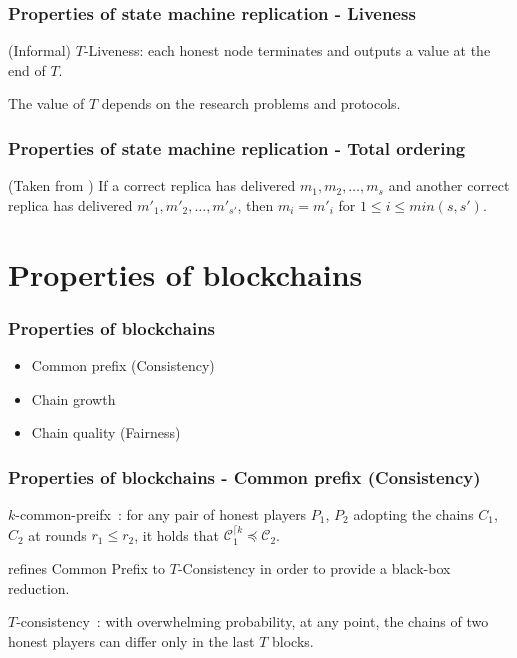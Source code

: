 \documentclass{beamer}
\begin{document}
\begin{frame}
\frametitle{Properties of state machine replication - Liveness}

(Informal) $T$-Liveness: each honest node terminates and outputs a value at the end of $T$.

The value of $T$ depends on the research problems and protocols.

\end{frame}


\begin{frame}
\frametitle{Properties of state machine replication - Total ordering}

(Taken from \cite{duan2018beat}) If a correct replica has delivered $m_1, m_2, \dots ,m_s$ and another correct replica has delivered $m'_1,m'_2, \dots,m'_{s'}$, then $m_i = m'_i$ for $1 \leq i \leq min(s, s')$.

\end{frame}


\section{Properties of blockchains}

\begin{frame}
\frametitle{Properties of blockchains}

\begin{itemize}
    \item Common prefix (Consistency)
    \item Chain growth
    \item Chain quality (Fairness)
\end{itemize}

\end{frame}


\begin{frame}
\frametitle{Properties of blockchains - Common prefix (Consistency)}

$k$-common-preifx~\cite{garay2015bitcoin}:
for any pair of honest players $P_1$, $P_2$ adopting the chains $C_1$, $C_2$ at rounds $r_1 \leq r_2$, it holds that $\mathcal{C}_{1}^{\lceil k} \preceq \mathcal{C}_2$.

\cite{pass2017analysis} refines Common Prefix to $T$-Consistency in order to provide a black-box reduction.

$T$-consistency~\cite{pass2017analysis}:
with overwhelming probability, at any point, the chains of two honest players can differ only in the last $T$ blocks.


\end{frame}
\end{document}
